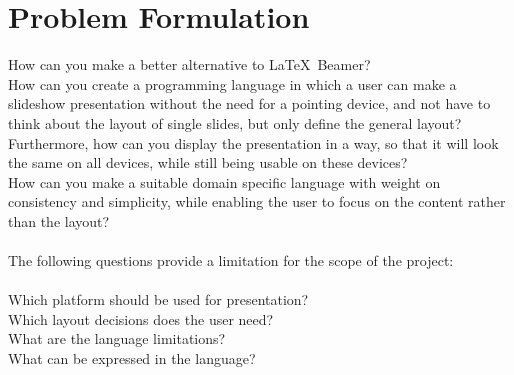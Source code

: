 \chapter{Problem Formulation}
\label{ProblemFormulation}
How can you make a better alternative to \LaTeX~Beamer? \\
How can you create a programming language in which a user can make a slideshow presentation without the need for a pointing device, and not have to think about the layout of single slides, but only define the general layout? \\
Furthermore, how can you display the presentation in a way, so that it will look the same on all devices, while still being usable on these devices? \\
How can you make a suitable domain specific language with weight on consistency and simplicity, while enabling the user to focus on the content rather than the layout?
\\ \\
The following questions provide a limitation for the scope of the project:
\\ \\
Which platform should be used for presentation? \\
Which layout decisions does the user need? \\
What are the language limitations? \\
What can be expressed in the language?